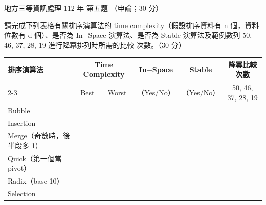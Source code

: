\begin{pastexam}[label={px:df3-112-ds-05}]{地方三等資訊處理 112 年 第五題}
（申論；30 分）

請完成下列表格有關排序演算法的 time complexity（假設排序資料有 n 個，資料位數有 d 個）、是否為
In$-$Space 演算法、是否為 Stable 演算法及範例數列 50, 46, 37, 28, 19 進行降冪排列時所需的比較
次數。（30 分）
\begin{center}
\small
\begin{tabular}{|p{2.6cm}|c|c|c|c|c|}
\hline
\multirow{2}{*}{排序演算法} & \multicolumn{2}{c|}{Time Complexity} & In$-$Space & Stable & 降冪比較次數 \\ \cline{2-3}\cline{6-6}
 & Best & Worst & （Yes/No） & （Yes/No） & 50, 46, 37, 28, 19 \\ \hline
Bubble & & & & & \\ \hline
Insertion & & & & & \\ \hline
Merge（奇數時，後半段多 1） & & & & & \\ \hline
Quick（第一個當 pivot） & & & & & \\ \hline
Radix（base 10） & & & & & \\ \hline
Selection & & & & & \\ \hline
\end{tabular}
\end{center}
\end{pastexam}

